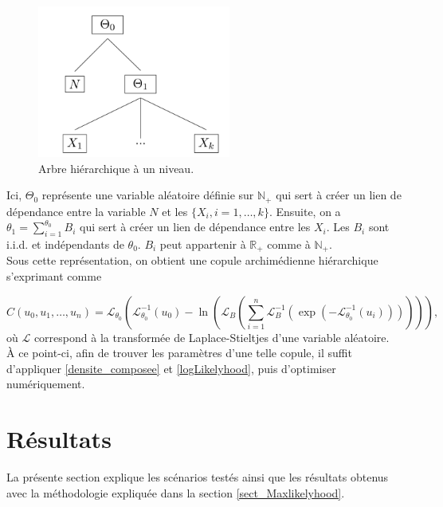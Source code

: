 \documentclass{article}
\begin{document}
		\begin{figure}[H]
			\centering
			\includegraphics[height=5cm]{Hierarchie}
			\renewcommand{\figurename}{Illustration}
			\caption{Arbre hiérarchique à un niveau.} \label{graph_hierarchie}
		\end{figure}
	
		Ici, $\Theta_0$ représente une variable aléatoire définie sur $\mathbb{N}_+$ qui sert à créer un lien de dépendance entre la variable $N$ et les $\{X_i, i=1,\dots , k\}$. Ensuite, on a $\theta_1 = \sum_{i=1}^{\theta_0} B_i$ qui sert à créer un lien de dépendance entre les $X_i$. Les $B_i$ sont i.i.d. et indépendants de $\theta_0$. $B_i$ peut appartenir à $\mathbb{R}_+$ comme à $\mathbb{N}_+$. \\
		
		Sous cette représentation, on obtient une copule archimédienne hiérarchique s'exprimant comme
		
		\begin{equation}
		C(u_0, u_1, \dots, u_n) =
			\mathscr{L}_{\theta_0} \left(
				\mathscr{L}_{\theta_0}^{-1}(u_0) - \ln \left( 
					\mathscr{L}_B  \left(
						\sum_{i=1}^{n} \mathscr{L}_{B}^{-1} \left(
						 \exp \left(
						  - \mathscr{L}_{\theta_0}^{-1}(u_i) 
						  \right) \right)\right)\right)\right),
		\end{equation}
		où $\mathscr{L}$ correspond à la transformée de Laplace-Stieltjes d'une variable aléatoire.\\
		
		À ce point-ci, afin de trouver les paramètres d'une telle copule, il suffit d'appliquer \eqref{densite_composee} et \eqref{logLikelyhood}, puis d'optimiser numériquement.
		
	\section{Résultats}
		La présente section explique les scénarios testés ainsi que les résultats obtenus avec la méthodologie expliquée dans la section \ref{sect_Maxlikelyhood}.\\
		
\end{document}
